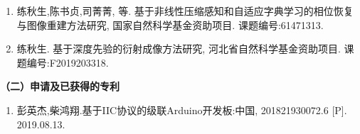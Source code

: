 \begin{achievement}

\project
\begin{enumerate}\setlength{\itemsep}{0pt}
\renewcommand{\labelenumi}{[\theenumi]}
\item 练秋生,陈书贞,司菁菁, 等. 基于非线性压缩感知和自适应字典学习的相位恢复与图像重建方法研究, 国家自然科学基金资助项目. 课题编号:61471313.
\item 练秋生. 基于深度先验的衍射成像方法研究, 河北省自然科学基金资助项目. 课题编号:F2019203318.
\end{enumerate}


{\noindent\textbf{（二）申请及已获得的专利}}    %
\begin{enumerate}\setlength{\itemsep}{0pt}
\renewcommand{\labelenumi}{[\theenumi]}
\item 彭英杰,柴鸿翔.基于IIC协议的级联Arduino开发板:中国, 201821930072.6 [P]. 2019.08.13.
\end{enumerate}


\end{achievement} 